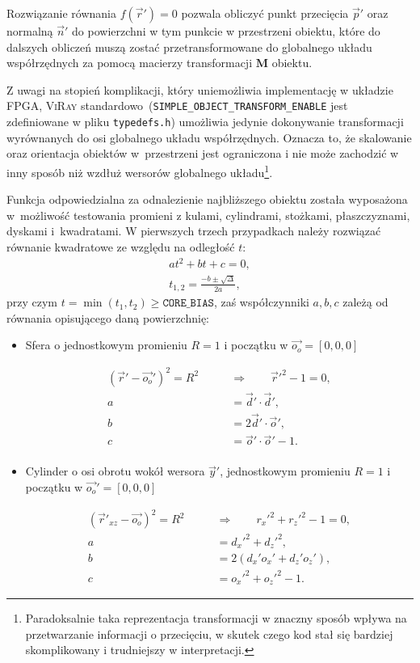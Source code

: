 \begin{enumerate}
Rozwiązanie równania $f(\vec{r}') = 0$ pozwala obliczyć punkt przecięcia $\vec{p}'$ oraz normalną $\vec{n}'$ do powierzchni w tym punkcie w przestrzeni obiektu, które do dalszych obliczeń muszą zostać przetransformowane do globalnego układu współrzędnych za pomocą macierzy transformacji $\mathbf{M}$ obiektu.

Z uwagi na stopień komplikacji, który uniemożliwia implementację w układzie FPGA, \textsc{ViRay} standardowo~(\texttt{SIMPLE\_OBJECT\_TRANSFORM\_ENABLE} jest zdefiniowane w pliku \texttt{typedefs.h}) umożliwia jedynie dokonywanie transformacji wyrównanych do osi globalnego układu współrzędnych. Oznacza to, że skalowanie oraz orientacja obiektów w~przestrzeni jest ograniczona i nie może zachodzić w inny sposób niż wzdłuż wersorów globalnego układu\footnote{Paradoksalnie taka reprezentacja transformacji w znaczny sposób wpływa na przetwarzanie informacji o przecięciu, w skutek czego kod stał się bardziej skomplikowany i trudniejszy w interpretacji.}. 

Funkcja odpowiedzialna za odnalezienie najbliższego obiektu została wyposażona w~możliwość testowania promieni z kulami, cylindrami, stożkami, płaszczyznami, dyskami i~kwadratami. W pierwszych trzech przypadkach należy rozwiązać równanie kwadratowe ze względu na odległość $t$:
\begin{align*}
at^2 + bt + c = 0,\\
t_{1,2} = \frac{-b\pm\sqrt{\Delta}}{2a},
\end{align*}
przy czym $t = \min(t_1, t_2) \geq \mathtt{CORE\_BIAS}$, zaś współczynniki $a, b, c$ zależą od równania opisującego daną powierzchnię:
\begin{itemize}
\item Sfera o jednostkowym promieniu $R=1$ i początku w $\vec{o_o} = [0,0,0]$

\begin{align*}
(\vec{r}' - \vec{o_o}')^2 = R^2\qquad &\Rightarrow \qquad\vec{r}'^2 - 1 = 0,\\
a &= \vec{d}'\cdot\vec{d}',\\
b &= 2\vec{d}'\cdot\vec{o}',\\
c &= \vec{o}'\cdot\vec{o}' - 1.\\
\end{align*}

\item Cylinder o osi obrotu wokół wersora $\vec{y}'$, jednostkowym promieniu $R=1$ i początku w $\vec{o_o}' = [0,0,0]$

\begin{align*}
(\vec{r}'_{xz} - \vec{o_o})^2 = R^2\qquad &\Rightarrow\qquad r_x'^2 + r_z'^2 - 1 = 0,\\
a &= d_x'^2 + d_z'^2,\\
b &= 2\left(d_x'o_x' + d_z'o_z' \right),\\
c &= o_x'^2 + o_z'^2 - 1.
\end{align*}


\end{itemize}
\end{enumerate}
